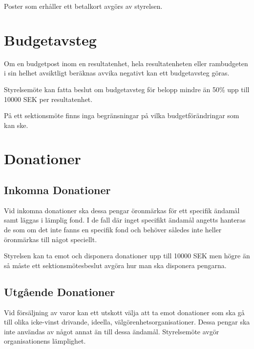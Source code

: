 \documentclass{dsekprotokoll}
\begin{document}
Poster som erhåller ett betalkort avgörs av styrelsen.

\section{Budgetavsteg}
Om en budgetpost inom en resultatenhet, hela resultatenheten eller rambudgeten i sin helhet avsiktligt beräknas avvika negativt kan ett budgetavsteg göras.

Styrelsemöte kan fatta beslut om budgetavsteg för belopp mindre än 50\% upp till 10000 SEK per resultatenhet.

På ett sektionsmöte finns inga begränsningar på vilka budgetförändringar som kan ske.

\section{Donationer}
\subsection{Inkomna Donationer}
Vid inkomna donationer ska dessa pengar öronmärkas för ett specifik ändamål samt läggas i lämplig fond. I de fall där inget specifikt ändamål angetts hanteras de som om det inte fanns en specifik fond och behöver således inte heller öronmärkas till något speciellt.

Styrelsen kan ta emot och disponera donationer upp till 10000 SEK men högre än så måste ett sektionsmötesbeslut avgöra hur man ska disponera pengarna.

\subsection{Utgående Donationer}
Vid försäljning av varor kan ett utskott välja att ta emot donationer som ska gå till olika icke-vinst drivande, ideella, välgörenhetsorganisationer. Dessa pengar ska inte användas av något annat än till dessa ändamål. Styrelsemöte avgör organisationens lämplighet.
\end{document}
